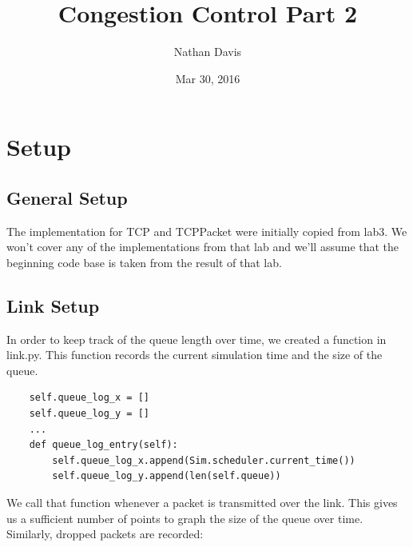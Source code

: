 \documentclass[11pt]{article}
\begin{document}
\lstset{
  language=Python,
  basicstyle=\small,          %
  keywordstyle=\bfseries,
  identifierstyle=,           %
  commentstyle=,              %
  stringstyle=\ttfamily,      %
  showstringspaces=false,     %
  numbers=left,
  numberstyle=\tiny,
  numbersep=5pt,
  frame=tb,
}

\title{Congestion Control Part 2}

\author{Nathan Davis}

\date{Mar 30, 2016}

\maketitle

\section{Setup}

\subsection{General Setup}

The implementation for TCP and TCPPacket were initially copied from lab3. We won't cover any of the implementations from that lab and we'll assume that the beginning code base is taken from the result of that lab.

\subsection{Link Setup}

In order to keep track of the queue length over time, we created a function in link.py. This function records the current simulation time and the size of the queue.

\vspace{5mm}

\begin{lstlisting}
    self.queue_log_x = []
    self.queue_log_y = []
    ...
    def queue_log_entry(self):
        self.queue_log_x.append(Sim.scheduler.current_time())
        self.queue_log_y.append(len(self.queue))
\end{lstlisting}

\vspace{5mm}

We call that function whenever a packet is transmitted over the link. This gives us a sufficient number of points to graph the size of the queue over time. Similarly, dropped packets are recorded:
\end{document}
